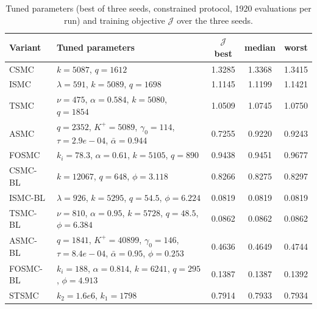 \begin{table}[!t]
\centering
\caption{Tuned parameters (best of three seeds, constrained protocol, 1920 evaluations per run) and training objective $\mathcal J$ over the three seeds.}
\label{tab:gains}
\small
\begin{tabular}{@{}lp{10.2cm}ccc@{}}
\toprule
\textbf{Variant} & \textbf{Tuned parameters} & \textbf{$\mathcal J$ best} & \textbf{median} & \textbf{worst} \\
\midrule
CSMC & $k=5087$, $q=1612$ & 1.3285 & 1.3368 & 1.3415 \\
ISMC & $\lambda=591$, $k=5089$, $q=1698$ & 1.1145 & 1.1199 & 1.1421 \\
TSMC & $\nu=475$, $\alpha=0.584$, $k=5080$, $q=1854$ & 1.0509 & 1.0745 & 1.0750 \\
ASMC & $q=2352$, $K^+=5089$, $\gamma_0=114$, $\tau=2.9e-04$, $\bar\alpha=0.944$ & 0.7255 & 0.9220 & 0.9243 \\
FOSMC & $k_i=78.3$, $\alpha=0.61$, $k=5105$, $q=890$ & 0.9438 & 0.9451 & 0.9677 \\
CSMC-BL & $k=12067$, $q=648$, $\phi=3.118$ & 0.8266 & 0.8275 & 0.8297 \\
ISMC-BL & $\lambda=926$, $k=5295$, $q=54.5$, $\phi=6.224$ & 0.0819 & 0.0819 & 0.0819 \\
TSMC-BL & $\nu=810$, $\alpha=0.95$, $k=5728$, $q=48.5$, $\phi=6.384$ & 0.0862 & 0.0862 & 0.0862 \\
ASMC-BL & $q=1841$, $K^+=40899$, $\gamma_0=146$, $\tau=8.4e-04$, $\bar\alpha=0.95$, $\phi=0.253$ & 0.4636 & 0.4649 & 0.4744 \\
FOSMC-BL & $k_i=188$, $\alpha=0.814$, $k=6241$, $q=295$, $\phi=4.913$ & 0.1387 & 0.1387 & 0.1392 \\
STSMC & $k_2=1.6e6$, $k_1=1798$ & 0.7914 & 0.7933 & 0.7934 \\
\bottomrule
\end{tabular}
\end{table}
